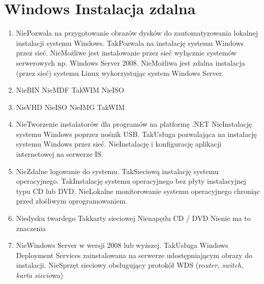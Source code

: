 
\newpage
\section{Windows Instalacja zdalna}
	\begin{enumerate}
		\item {}%
		{Nie}{Pozwala na przygotowanie obrazów dysków do zautomatyzowania lokalnej instalacji systemu Windows.}%
		{Tak}{Pozwala na instalację systemu Windows przez sieć.}%
		{Nie}{Możliwe jest instalowanie przez sieć wyłącznie systemów serwerowych np. Windows Server 2008.}%
		{Nie}{Możliwa jest zdalna instalacja (przez sieć) systemu Linux wykorzystując system Windows Server.}
		\item {}%
		{Nie}{BIN}%
		{Nie}{MDF}%
		{Tak}{WIM}%
		{Nie}{ISO}
		\item {}%
		{Nie}{VHD}%
		{Nie}{ISO}%
		{Nie}{IMG}%
		{Tak}{WIM}
		\item {}%
		{Nie}{Tworzenie instalatorów dla programów na platformę .NET}%
		{Nie}{Instalację systemu Windows poprzez nośnik USB.}%
		{Tak}{Usługa pozwalająca na instalację systemu Windows przez sieć.}%
		{Nie}{Instalację i konfigurację aplikacji internetowej na serwerze IS.}
		\item {}%
		{Nie}{Zdalne logowanie do systemu.}%
		{Tak}{Sieciową instalację systemu operacyjnego.}%
		{Tak}{Instalację systemu operacyjnego bez płyty instalacyjnej typu CD lub DVD.}%
		{Nie}{Lokalne monitorowanie systemu operacyjnego chroniąc przed złośliwym oprogramowaniem.}
		\item {}%
		{Nie}{dysku twardego}%
		{Tak}{karty sieciowej}%
		{Nie}{napędu CD / DVD}%
		{Nie}{nie ma to znaczenia}
		\item {}%
		{Nie}{Windows Server w wersji 2008 lub wyższej.}%
		{Tak}{Usługa Windows Deployment Services zainstalowana na serwerze udostępniającym obrazy do instalacji.}%
		{Nie}{Sprzęt sieciowy obsługujący protokół WDS (ro\textsl{uter, switch, karta siecio}wa)}%

\end{enumerate}
